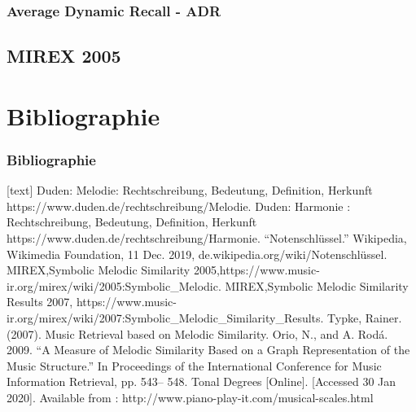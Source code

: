 \documentclass{beamer}
\begin{document}
	\begin{frame}
		\frametitle{Average Dynamic Recall - ADR}
		
	\end{frame}

	\subsection{MIREX 2005}


	\section{Bibliographie}

	\begin{frame}[allowframebreaks]
		\frametitle{Bibliographie}
		\begin{thebibliography}{5}
			[text]
			 Duden: Melodie: Rechtschreibung, Bedeutung, Definition, Herkunft
			https://www.duden.de/rechtschreibung/Melodie.
			 Duden: Harmonie : Rechtschreibung, Bedeutung, Definition, Herkunft
			https://www.duden.de/rechtschreibung/Harmonie.
			 “Notenschlüssel.” Wikipedia, Wikimedia Foundation, 11 Dec. 2019, de.wikipedia.org/wiki/Notenschlüssel.
			 MIREX,Symbolic Melodic Similarity 2005,https://www.music-ir.org/mirex/wiki/2005:Symbolic\_Melodic.
			 MIREX,Symbolic Melodic Similarity Results 2007, https://www.music-ir.org/mirex/wiki/2007:Symbolic\_Melodic\_Similarity\_Results.
			 Typke, Rainer. (2007). Music Retrieval based on Melodic Similarity.
			 Orio, N., and A. Rodá. 2009. “A Measure of Melodic Similarity Based on a Graph Representation of the Music Structure.” In Proceedings of the International Conference for Music Information Retrieval, pp. 543– 548.
			 Tonal Degrees [Online]. [Accessed 30 Jan 2020]. Available from : http://www.piano-play-it.com/musical-scales.html
		\end{thebibliography}
	\end{frame}
\end{document}
